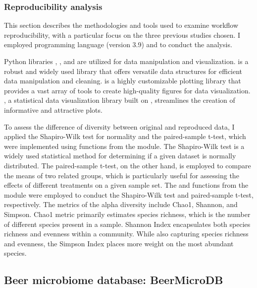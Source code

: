             \subsubsection{Reproducibility analysis}

            This section describes the methodologies and tools used to examine workflow reproducibility, with a particular focus on the three previous studies chosen. I employed  programming language (version 3.9) and  to conduct the analysis. 
            
            Python libraries \cite{reback2020pandas}, \cite{hunter2007matplotlib}, and \cite{Waskom2021} are utilized for data manipulation and visualization.  is a robust and widely used library that offers versatile data structures for efficient data manipulation and cleaning.  is a highly customizable plotting library that provides a vast array of tools to create high-quality figures for data visualization. , a statistical data visualization library built on , streamlines the creation of informative and attractive plots.
            
            To assess the difference of diversity between original and reproduced data, I applied the Shapiro-Wilk test for normality and the paired-sample t-test, which were implemented using functions from the  module. The Shapiro-Wilk test is a widely used statistical method for determining if a given dataset is normally distributed. The paired-sample t-test, on the other hand, is employed to compare the means of two related groups, which is particularly useful for assessing the effects of different treatments on a given sample set. The  and  functions from the \cite{2020SciPy-NMeth} module were employed to conduct the Shapiro-Wilk test and paired-sample t-test, respectively. The metrics of the alpha diversity include Chao1, Shannon, and Simpson. Chao1 metric primarily estimates species richness, which is the number of different species present in a sample. Shannon Index encapsulates both species richness and evenness within a community. While also capturing species richness and evenness, the Simpson Index places more weight on the most abundant species.
            
    \subsection{Beer microbiome database: BeerMicroDB}

